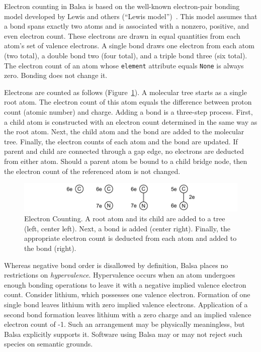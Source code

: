 \documentclass{article}
\def\ttt{\texttt}
\begin{document}
Electron counting in Balsa is based on the well-known electron-pair bonding model developed by Lewis and others (\enquote{Lewis model})~\cite{lewis:1916}. This model assumes that a bond spans exactly two atoms and is associated with a nonzero, positive, and even electron count. These electrons are drawn in equal quantities from each atom's set of valence electrons. A single bond draws one electron from each atom (two total), a double bond two (four total), and a triple bond three (six total). The electron count of an atom whose \ttt{element} attribute equals \ttt{None} is always zero. Bonding does not change it.

Electrons are counted as follows (Figure~\ref{fig:electron-counting}). A molecular tree starts as a single root atom. The electron count of this atom equals the difference between proton count (atomic number) and charge. Adding a bond is a three-step process. First, a child atom is constructed with an electron count determined in the same way as the root atom. Next, the child atom and the bond are added to the molecular tree. Finally, the electron counts of each atom and the bond are updated. If parent and child are connected through a gap edge, no electrons are deducted from either atom. Should a parent atom be bound to a child bridge node, then the electron count of the referenced atom is not changed.

\begin{figure}
    \centering
    \includegraphics[width=\columnwidth]{electron-counting.pdf}
    \caption{Electron Counting. A root atom and its child are added to a tree (left, center left). Next, a bond is added (center right). Finally, the appropriate electron count is deducted from each atom and added to the bond (right).}
    \label{fig:electron-counting}
\end{figure}

Whereas negative bond order is disallowed by definition, Balsa places no restrictions on \textit{hypervalence}. Hypervalence occurs when an atom undergoes enough bonding operations to leave it with a negative implied valence electron count. Consider lithium, which possesses one valence electron. Formation of one single bond leaves lithium with zero implied valence electrons. Application of a second bond formation leaves lithium with a zero charge and an implied valence electron count of -1. Such an arrangement may be physically meaningless, but Balsa explicitly supports it. Software using Balsa may or may not reject such species on semantic grounds.
\end{document}
